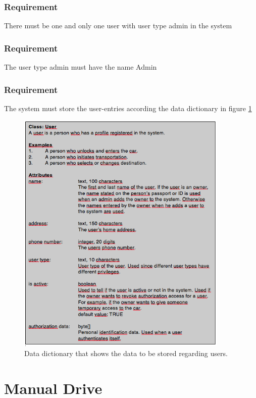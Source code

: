 \documentclass{article}
\begin{document}
{      \subsubsection{Requirement}
\hfill \break 
\- \- \-There must be one and only one user with user type admin in the system
      \subsubsection{Requirement}
\hfill \break 
\- \- \-The user type admin must have the name Admin
      \subsubsection{Requirement}
\hfill \break 
\- \- \-The system must store the user-entries according the data dictionary in figure \ref{fi:dd1}

\begin{figure}[!htb]   
 \centering
 \includegraphics[width=0.9\textwidth]
    {DD1.png}
  \caption{Data dictionary that shows the data to be stored regarding users.}
  \label{fi:dd1}
\end{figure}
\bigskip

\section{Manual Drive}
}
\end{document}
